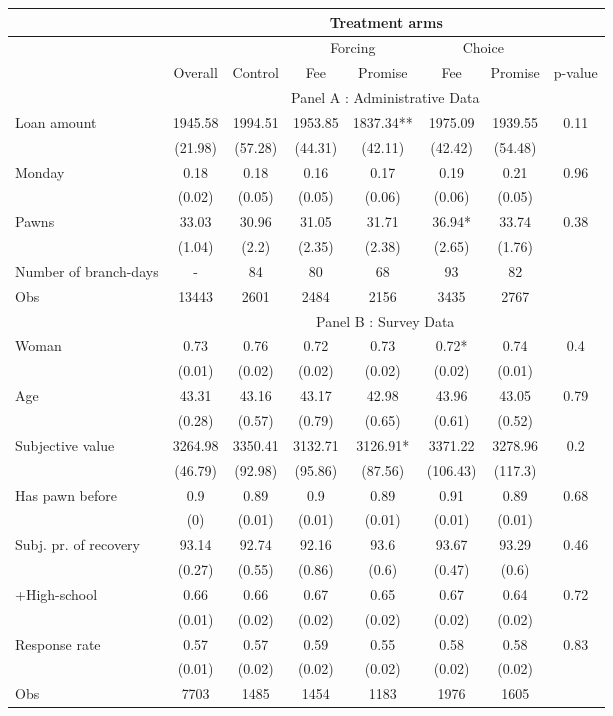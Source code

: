 \begin{tabular}{lccccccc}
\toprule
      &       & \multicolumn{5}{c}{Treatment arms}    &  \\
\midrule
      &       &       & \multicolumn{2}{c}{Forcing } & \multicolumn{2}{c}{Choice} &  \\
\midrule
\midrule
      & Overall & Control & Fee   & Promise & Fee   & Promise & p-value \\
\midrule
      & \multicolumn{7}{c}{Panel A : Administrative Data} \\
\midrule
\midrule
Loan amount  & 1945.58 & 1994.51 & 1953.85 & 1837.34** & 1975.09 & 1939.55 & 0.11 \\
      & (21.98) & (57.28) & (44.31) & (42.11) & (42.42) & (54.48) &  \\
Monday & 0.18  & 0.18  & 0.16  & 0.17  & 0.19  & 0.21  & 0.96 \\
      & (0.02) & (0.05) & (0.05) & (0.06) & (0.06) & (0.05) &  \\
Pawns & 33.03 & 30.96 & 31.05 & 31.71 & 36.94* & 33.74 & 0.38 \\
      & (1.04) & (2.2) & (2.35) & (2.38) & (2.65) & (1.76) &  \\
\midrule
Number of branch-days & -     & 84    & 80    & 68    & 93    & 82    &  \\
Obs   & 13443 & 2601  & 2484  & 2156  & 3435  & 2767  &  \\
\midrule
      & \multicolumn{7}{c}{Panel B : Survey Data} \\
\midrule
\midrule
Woman & 0.73  & 0.76  & 0.72  & 0.73  & 0.72* & 0.74  & 0.4 \\
      & (0.01) & (0.02) & (0.02) & (0.02) & (0.02) & (0.01) &  \\
Age   & 43.31 & 43.16 & 43.17 & 42.98 & 43.96 & 43.05 & 0.79 \\
      & (0.28) & (0.57) & (0.79) & (0.65) & (0.61) & (0.52) &  \\
Subjective value & 3264.98 & 3350.41 & 3132.71 & 3126.91* & 3371.22 & 3278.96 & 0.2 \\
      & (46.79) & (92.98) & (95.86) & (87.56) & (106.43) & (117.3) &  \\
Has pawn before & 0.9   & 0.89  & 0.9   & 0.89  & 0.91  & 0.89  & 0.68 \\
      & (0)   & (0.01) & (0.01) & (0.01) & (0.01) & (0.01) &  \\
Subj. pr. of recovery & 93.14 & 92.74 & 92.16 & 93.6  & 93.67 & 93.29 & 0.46 \\
      & (0.27) & (0.55) & (0.86) & (0.6) & (0.47) & (0.6) &  \\
+High-school & 0.66  & 0.66  & 0.67  & 0.65  & 0.67  & 0.64  & 0.72 \\
      & (0.01) & (0.02) & (0.02) & (0.02) & (0.02) & (0.02) &  \\
Response rate & 0.57  & 0.57  & 0.59  & 0.55  & 0.58  & 0.58  & 0.83 \\
      & (0.01) & (0.02) & (0.02) & (0.02) & (0.02) & (0.02) &  \\
\midrule
Obs   & 7703  & 1485  & 1454  & 1183  & 1976  & 1605  &  \\
\bottomrule
\bottomrule
\end{tabular}%
